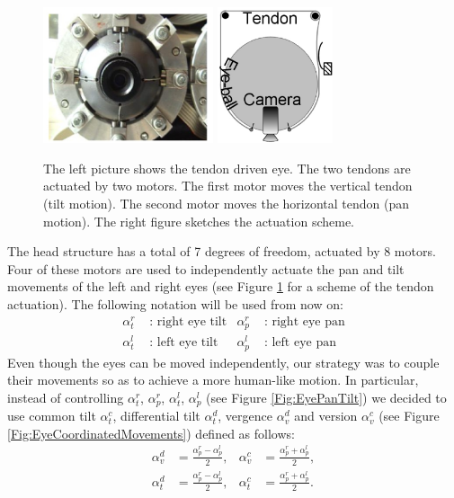 \begin{figure}[ht]
  \centering
  \includegraphics[height=40mm]{Figure/EyePhoto.eps} \hspace{1cm}
  \includegraphics[height=40mm]{Figure/EyeSection.eps}\\
  \caption{The left picture shows the tendon driven eye. The
 two tendons are actuated by two motors. The first motor moves the vertical
  tendon (tilt motion). The second motor moves the horizontal tendon (pan motion). The
  right figure sketches the actuation scheme.}\label{Fig:EyeSection}
\end{figure}


The head structure has a total of 7 degrees of freedom, actuated by 8 motors. Four of these motors are used to independently actuate the pan and tilt movements of the left and right eyes (see Figure \ref{Fig:EyeSection} for a scheme of the tendon actuation). The following notation will be used from now on:
\begin{align*}
\alpha_t^r & \mbox{ : } \mbox{right eye tilt} & \alpha_p^r & \mbox{ : } \mbox{right eye pan}\\
\alpha_t^l & \mbox{ : } \mbox{left eye tilt} & \alpha_p^l & \mbox{ : } \mbox{left eye pan}
\end{align*}
Even though the eyes can be moved independently, our strategy was to couple their movements so as to achieve a more human-like motion. In particular, instead of controlling $\alpha_t^r$, $\alpha_p^r$, $\alpha_t^l$, $\alpha_p^l$ (see Figure \ref{Fig:EyePanTilt}) we decided to use common tilt $\alpha_t^c$, differential tilt $\alpha_t^d$, vergence $\alpha_v^d$ and version $\alpha_v^c$ (see Figure \ref{Fig:EyeCoordinatedMovements}) defined as follows: %
\begin{align*}
\alpha_v^d & = \frac{\alpha_p^r - \alpha_p^l}{2}, & \alpha_v^c & = \frac{\alpha_p^r + \alpha_p^l}{2},\\
\alpha_t^d & = \frac{\alpha_p^r - \alpha_p^l}{2}, & \alpha_t^c & = \frac{\alpha_p^r + \alpha_p^l}{2}.
\end{align*}

